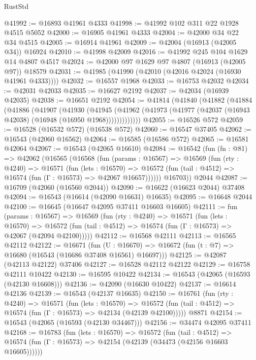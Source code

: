 \begin{lexlean}{RustStd}
\begin{coremodule}
@41992 := @16893 @41961 @4333
@41998 := @41992 @102 @311 @22 @1928 @4515 @5052
@42000 := @16905 @41961 @4333
@42004 := @42000 @34 @22 @34 @4515
@42005 := @16914 @41961
@42009 := @42004 (@16913 (@42005 @34)) @16924
@42010 := @41998 @42009
@42016 := @41992 @245 @104 @1629 @14 @4807 @4517
@42024 := @42000 @97 @1629 @97 @4807 (@16913 (@42005 @97)) @18579
@42031 := @41985 (@41990 (@42010 (@42016 @42024 (@16930 @41961 @4333))))
@42032 := @16557 @1968
@42033 := @16753 @42032
@42034 := @42031 @42033
@42035 := @16627 @2192
@42037 := @42034 (@16939 @42035)
@42038 := @16651 @2192
@42054 := @41814
    (@41840
      (@41882
        (@41884
          (@41886
            (@41907
              (@41930
                (@41945
                  (@41962 (@41973 (@41977 (@42037 (@16943 @42038) (@16948 (@16950 @1968)))))))))))))
@42055 := @16526 @572
@42059 := @16528 (@16532 @572) (@16538 @572)
@42060 := @16547 @37405
@42062 := @16543 (@42060 @16562)
@42064 := @16585 (@16586 @572)
@42065 := @16581 @42064
@42067 := @16543 (@42065 @16610)
@42084 := @16542
    (fun (fn : @81) =>
    @42062
      (@16565
        (@16568
          (fun (params : @16567) =>
          @16569
            (fun (rty : @4240) =>
            @16571
              (fun (lets : @16570) =>
              @16572 (fun (tail : @4512) => @16574 (fun (Γ : @16573) => @42067 @16657))))))
        @16703))
    @2044
@42087 := @16709 (@42060 (@16560 @2044))
@42090 := @16622 (@16623 @2044) @37408
@42094 := @16543 (@16614 (@42090 @16631) @16635)
@42095 := @16648 @2044
@42100 := @16645 (@16647 @42095 @37411 @16603 @16605)
@42111 := fun (params : @16567) =>
  @16569
    (fun (rty : @4240) =>
    @16571
      (fun (lets : @16570) =>
      @16572 (fun (tail : @4512) => @16574 (fun (Γ : @16573) => @42067 (@42094 @42100)))))
@42112 := @16568 @42111
@42113 := @16565 @42112
@42122 := @16671
    (fun (U : @16670) => @16672 (fun (t : @7) => @16680 (@16543 (@16686 @37408 @16561) @16697)))
@42125 := @42087 (@42113 @42122) @37406
@42127 := @16528 @42112 @42122
@42129 := @16758 @42111 @10422
@42130 := @16595 @10422
@42134 := @16543 (@42065 (@16593 (@42130 @16608)))
@42136 := @42090 (@16630 @10422)
@42137 := @16614 @42136
@42139 := @16543 (@42137 @16635)
@42150 := @16761
    (fun (rty : @4240) =>
    @16571
      (fun (lets : @16570) =>
      @16572 (fun (tail : @4512) => @16574 (fun (Γ : @16573) => @42134 (@42139 @42100)))))
    @8871
@42154 := @16543 (@42065 (@16593 (@42130 @34467)))
@42156 := @34474 @42095 @37411
@42168 := @16783
    (fun (lets : @16570) =>
    @16572
      (fun (tail : @4512) =>
      @16574 (fun (Γ : @16573) => @42154 (@42139 (@34473 (@42156 @16603 @16605))))))

\end{coremodule}
\end{lexlean}

